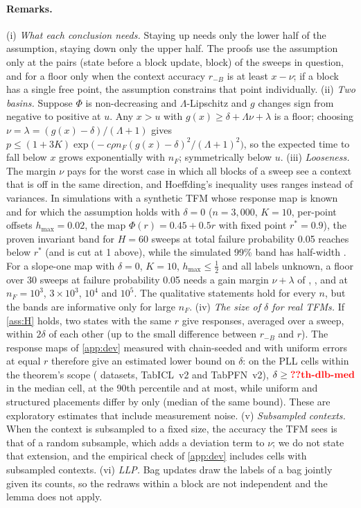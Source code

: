 \paragraph{Remarks.} (i) \emph{What each conclusion needs.} Staying up needs only the lower half of the assumption,
staying down only the upper half. The proofs use the assumption only at the pairs (state before a block update, block)
of the sweeps in question, and for a floor only when the context accuracy $r_{-B}$ is at least $x-\nu$; if a block has
a single free point, the assumption constrains that point individually. (ii) \emph{Two basins.} Suppose $\Phi$ is non-decreasing and $\Lambda$-Lipschitz and $g$ changes sign
from negative to positive at $u$. Any $x>u$ with $g(x)\ge\delta+\Lambda\nu+\lambda$ is a floor; choosing
$\nu=\lambda=(g(x)-\delta)/(\Lambda+1)$ gives $p\le(1+3K)\exp\!\big(-c\rho n_F(g(x)-\delta)^2/(\Lambda+1)^2\big)$, so the expected
time to fall below $x$ grows exponentially with $n_F$; symmetrically below $u$. (iii) \emph{Looseness.} The margin $\nu$
pays for the worst case in which all blocks of a sweep see a context that is off in the same direction, and
Hoeffding's inequality uses ranges instead of variances. In simulations with a synthetic TFM whose response map is
known and for which the assumption holds with $\delta=0$ ($n=3{,}000$, $K=10$, per-point offsets $h_{\max}=0.02$, the
map $\Phi(r)=0.45+0.5r$ with fixed point $r^*=0.9$), the proven invariant band for $H=60$ sweeps at total failure
probability 0.05 reaches  below $r^*$ (and is cut at 1 above), while the simulated 99\% band has
half-width . For a slope-one map with $\delta=0$, $K=10$, $h_{\max}\le\frac12$ and all labels
unknown, a floor over 30 sweeps at failure
probability 0.05 needs a gain margin $\nu+\lambda$ of , ,  and
 at $n_F=10^3$, $3\times10^3$, $10^4$ and $10^5$. The qualitative statements hold for every
$n$, but the bands are informative only for large $n_F$. (iv) \emph{The size of $\delta$ for real TFMs.} If \cref{ass:H} holds, two states with the same $r$ give
responses, averaged over a sweep, within $2\delta$ of each other (up to the small difference between $r_{-B}$ and $r$).
The response maps of \cref{app:dev} measured with chain-seeded and with uniform errors at equal $r$ therefore give an
estimated lower bound on $\delta$: on the  PLL cells within the theorem's scope ( datasets,
TabICL~v2 and TabPFN~v2), $\delta\ge\val{th-dlb-med}$ in the median cell,  at the 90th percentile and
 at most, while uniform and structured placements differ by only  (median of the
same bound). These are exploratory estimates that include measurement noise. (v) \emph{Subsampled contexts.} When the context is subsampled
to a fixed size, the accuracy the TFM sees is that of a random subsample, which adds a deviation term to $\nu$; we do not
state that extension, and the empirical check of \cref{app:dev} includes cells with subsampled contexts. (vi) \emph{LLP.}
Bag updates draw the labels of a bag jointly given its counts, so the redraws within a block are not independent and
the lemma does not apply.

